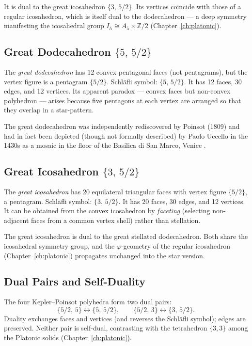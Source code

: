 It is dual to the great icosahedron \(\{3,\,5/2\}\).  Its
vertices coincide with those of a regular icosahedron, which is
itself dual to the dodecahedron — a deep symmetry manifesting
the icosahedral group \(I_h \cong A_5 \times \mathbb{Z}/2\)
(Chapter~\ref{ch:platonic}).

\subsection{Great Dodecahedron \texorpdfstring{$\{5,\,5/2\}$}{5,5/2}}
\label{ssec:great-dodecahedron}

The \emph{great dodecahedron} has 12 convex pentagonal faces
(not pentagrams), but the vertex figure is a pentagram
\(\{5/2\}\).  Schläfli symbol: \(\{5,\,5/2\}\).  It has 12
faces, 30 edges, and 12 vertices.  Its apparent paradox — convex
faces but non-convex polyhedron — arises because five pentagons
at each vertex are arranged so that they overlap in a
star-pattern.

The great dodecahedron was independently rediscovered by Poinsot
(1809) and had in fact been depicted (though not formally
described) by Paolo Uccello in the 1430s as a mosaic in the
floor of the Basilica di San Marco, Venice
\cite{cromwell_polyhedra}.

\subsection{Great Icosahedron \texorpdfstring{$\{3,\,5/2\}$}{3,5/2}}
\label{ssec:great-icosahedron}

The \emph{great icosahedron} has 20 equilateral triangular faces
with vertex figure \(\{5/2\}\), a pentagram.  Schläfli symbol:
\(\{3,\,5/2\}\).  It has 20 faces, 30 edges, and 12 vertices.
It can be obtained from the convex icosahedron by \emph{faceting}
(selecting non-adjacent faces from a common vertex shell) rather
than stellation.

The great icosahedron is dual to the great stellated dodecahedron.
Both share the icosahedral symmetry group, and the
\(\varphi\)-geometry of the regular icosahedron
(Chapter~\ref{ch:platonic}) propagates unchanged into the star
version.

\subsection{Dual Pairs and Self-Duality}
\label{ssec:dual-pairs}

The four Kepler–Poinsot polyhedra form two dual pairs:
\[
  \{5/2,\,5\} \longleftrightarrow \{5,\,5/2\},
  \qquad
  \{5/2,\,3\} \longleftrightarrow \{3,\,5/2\}.
\]
Duality exchanges faces and vertices (and reverses the Schläfli
symbol); edges are preserved.  Neither pair is self-dual,
contrasting with the tetrahedron \(\{3,3\}\) among the Platonic
solids (Chapter~\ref{ch:platonic}).

